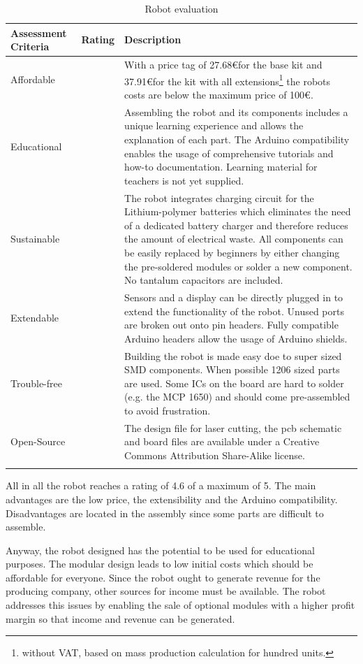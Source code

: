 \documentclass[11pt,a4paper]{article}
\newcounter{starnumber}
\newcommand{\stars}[1]{
  \forloop{starnumber}{1}{\value{starnumber} < 6}{
    \ifthenelse{#1 < \value{starnumber}}{\ding{73}}{\ding{72}}%
  }
}
\begin{document}
\begin{longtable}{p{}p{}p{}}
\toprule
Assessment Criteria    & Rating & Description \\
\midrule
Affordable      & \stars{5}    & With a price tag of 27.68\euro for the base kit and 37.91\euro for the kit with all extensions\footnote{without VAT, based on mass production calculation for hundred units.} the robots costs are below the maximum price of 100\euro.\\
Educational     & \stars{4}     & Assembling the robot and its components includes a unique learning experience and allows the explanation of each part. The Arduino compatibility enables the usage of comprehensive tutorials and how-to documentation. Learning material for teachers is not yet supplied. \\
Sustainable       & \stars{5}     &  The robot integrates charging circuit for the Lithium-polymer batteries which eliminates the need of a dedicated battery charger and therefore reduces the amount of electrical waste. All components can be easily replaced by beginners by either changing the pre-soldered modules or solder a new component. No tantalum capacitors are included.\\
Extendable & \stars{5}      &  Sensors and a display can be directly plugged in to extend the functionality of the robot. Unused ports are broken out onto pin headers. Fully compatible Arduino headers allow the usage of Arduino shields.\\
Trouble-free & \stars{4} & Building the robot is made easy doe to super sized SMD components. When possible 1206 sized parts are used. Some ICs on the board are hard to solder (e.g. the MCP 1650) and should come pre-assembled to avoid frustration.\\
Open-Source & \stars{5} & The design file for laser cutting, the pcb schematic and board files are available under a Creative Commons Attribution Share-Alike license.\\
\bottomrule
\caption{Robot evaluation}
\label{tbl:arduinorobot_eval}
\end{longtable}

All in all the robot reaches a rating of 4.6 of a maximum of 5. The main advantages are the low price, the extensibility and the Arduino compatibility. Disadvantages are located in the assembly since some parts are difficult to assemble.

Anyway, the robot designed has the potential to be used for educational purposes. The modular design leads to low initial costs which should be affordable for everyone. Since the robot ought to generate revenue for the producing company, other sources for income must be available. The robot addresses this issues by enabling the sale of optional modules with a higher profit margin so that income and revenue can be generated.
\end{document}
